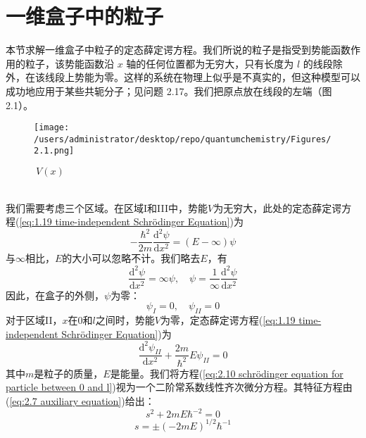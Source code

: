 \section{一维盒子中的粒子}
	本节求解一维盒子中粒子的定态薛定谔方程。我们所说的粒子是指受到势能函数作用的粒子，该势能函数沿 $x$ 轴的任何位置都为无穷大，只有长度为 $l$ 的线段除外，在该线段上势能为零。这样的系统在物理上似乎是不真实的，但这种模型可以成功地应用于某些共轭分子；见问题 2.17。我们把原点放在线段的左端（图 2.1）。
	\begin{figure}[h!]
		\centering
		\texttt{[image: /users/administrator/desktop/repo/quantumchemistry/Figures/2.1.png]}  %
		\caption{$\: V\left(x\right)$}
		\label{fig:2.1}
	\end{figure}
	\\
	\indent 我们需要考虑三个区域。在区域I和III中，势能$V$为无穷大，此处的定态薛定谔方程(\ref{eq:1.19 time-independent Schrödinger Equation})为
	\begin{equation*}
		-\frac{\hbar^2}{2m}\frac{\mathrm{d}^2\psi}{\mathrm{d}x^2} = \left(E - \infty\right)\psi
	\end{equation*}
	与$\infty$相比，$E$的大小可以忽略不计。我们略去$E$，有
	\begin{equation*}
		\frac{\mathrm{d}^2\psi}{\mathrm{d}x^2} = \infty \psi, \quad \psi = \frac{1}{\infty}\frac{\mathrm{d}^2\psi}{\mathrm{d}x^2}
	\end{equation*}
	因此，在盒子的外侧，$\psi$为零：
	\begin{equation}
		\psi_I=0, \quad \psi_{II} = 0
		\label{eq:2.9 psi outside the box}
	\end{equation}
	\indent 对于区域II，$x$在0和$l$之间时，势能$V$为零，定态薛定谔方程(\ref{eq:1.19 time-independent Schrödinger Equation})为
	\begin{equation}
		\frac{\mathrm{d}^2\psi_{II}}{\mathrm{d}x^2}+\frac{2m}{\hbar^2}E\psi_{II}=0
		\label{eq:2.10 schrödinger equation for particle between 0 and l}
	\end{equation}
	其中$m$是粒子的质量，$E$是能量。我们将方程(\ref{eq:2.10 schrödinger equation for particle between 0 and l})视为一个二阶常系数线性齐次微分方程。其特征方程由(\ref{eq:2.7 auxiliary equation})给出：
	\begin{equation*}
		s^2 + 2mE\hbar^{-2}=0
	\end{equation*}
	\begin{equation}
		s = \pm \left(-2mE\right)^{1/2}\hbar^{-1}
		\label{eq:2.11}
	\end{equation}
